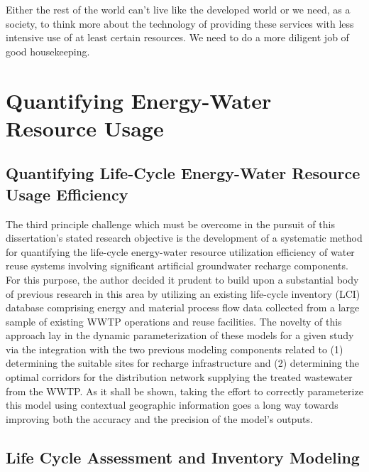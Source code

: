 \begin{savequote}[75mm]
Either the rest of the world can't live like the developed world or we need, as a society, to think more about the technology of providing these services with less intensive use of at least certain  resources. We need to do a more diligent job of good housekeeping.
\end{savequote}

\chapter{Quantifying Energy-Water Resource Usage}
\label{Chapter 3}

\newpage

\section{Quantifying Life-Cycle Energy-Water Resource Usage Efficiency}

The third principle challenge which must be overcome in the pursuit of this dissertation's stated research objective is the development of a systematic method for quantifying the life-cycle energy-water resource utilization efficiency of water reuse systems involving significant artificial groundwater recharge components. For this purpose, the author decided it prudent to build upon a substantial body of previous research in this area by utilizing an existing life-cycle inventory (LCI) database comprising energy and material process flow data collected from a large sample of existing WWTP operations and reuse facilities. The novelty of this approach lay in the dynamic parameterization of these models for a given study via the integration with the two previous modeling components related to (1) determining the suitable sites for recharge infrastructure and (2) determining the optimal corridors for the distribution network supplying the treated wastewater from the WWTP. As it shall be shown, taking the effort to correctly parameterize this model using contextual geographic information goes a long way towards improving both the accuracy and the precision of the model's outputs.

\section{Life Cycle Assessment and Inventory Modeling}

